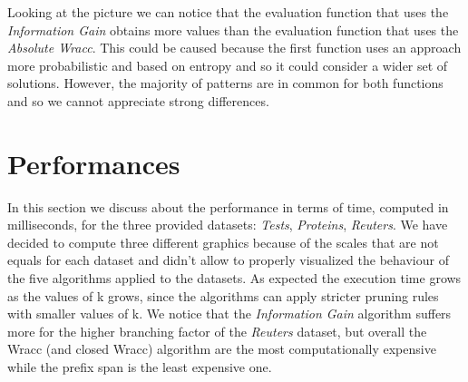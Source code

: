 \documentclass[10pt, a4paper]{article}
\begin{document}
	Looking at the picture we can notice that the evaluation function that uses the \textit{Information Gain} obtains more values than the evaluation function that uses the \textit{Absolute Wracc}. This could be caused because the first function uses an approach more probabilistic and based on entropy and so it could consider a wider set of solutions.
	However, the majority of patterns are in common for both functions and so we cannot appreciate strong differences.
	\section{Performances}
	In this section we discuss about the performance in terms of time, computed in milliseconds, for the three provided datasets: \textit{Tests}, \textit{Proteins}, \textit{Reuters}. 
	We have decided to compute three different graphics because of the scales that are not equals for each dataset and didn't allow to properly visualized the behaviour of the five algorithms applied to the datasets.
	As expected the execution time grows as the values of k grows, since the algorithms can apply stricter pruning rules with smaller values of k.
	We notice that the \textit{Information Gain} algorithm suffers more for the higher branching factor of the \textit{Reuters} dataset, but overall the Wracc (and closed Wracc) algorithm are the most computationally expensive while the prefix span is the least expensive one.
	\newpage
\end{document}
